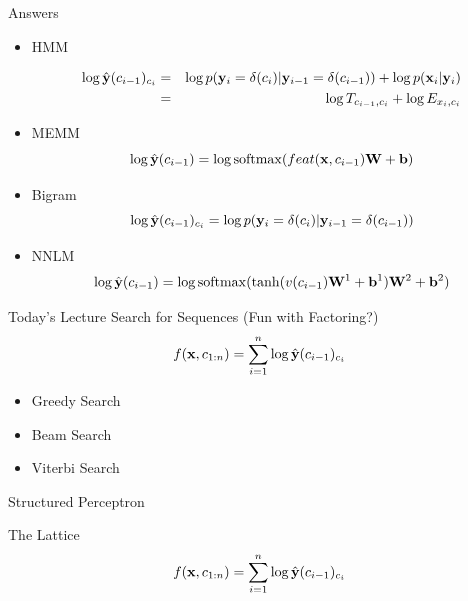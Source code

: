 \documentclass{beamer}
\def\Lattice{
    \matrix (network)
    [matrix of nodes,
    nodes in empty cells,
    ampersand replacement=\&,
    column sep={1cm},
    row sep={0.1cm},
    nodes={outer sep=0pt,circle,minimum size=0.5cm, minimum width=1.3cm,draw, rectangle} ]
    {
     O \& O \& O \& O \& O\\
     I-PER \& I-PER \& I-PER \& I-PER \& I-PER \\ 
     I-ORG \& I-ORG \& I-ORG \& I-ORG \& I-ORG \\ 
     I-LOC \& I-LOC \& I-LOC \& I-LOC \& I-LOC \\ 
     |[draw=none]| \\
     |[draw=none]| Mayor \& |[draw=none]| DeBlasio \& |[draw=none]| from \& |[draw=none]| New  \& |[draw=none]| York  \\  
};
}
\begin{document}
\begin{frame}[allowframebreaks]{Answers}
  \begin{itemize}
  \item HMM

    \begin{eqnarray*}
      \log \hat{\mathbf{y}}(c_{i-1})_{c_i} &=& \log p(\mathbf{y}_i = \delta(c_{i}) | \mathbf{y}_{i-1}=\delta(c_{i-1})) + \log p(\mathbf{x}_i| \mathbf{y}_i )  \\
                                       &=& \log T_{c_{i-1}, c_i}  + \log E_{x_i, c_i}
    \end{eqnarray*}



  \item MEMM
    \[\log \hat{\boldy}(c_{i-1}) = \log \softmax(feat(\boldx, c_{i-1}) \boldW + \boldb)  \]


    

  \item Bigram 
    \[\log \hat{\mathbf{y}}(c_{i-1})_{c_i} = \log p(\mathbf{y}_i = \delta(c_{i}) | \mathbf{y}_{i-1}=\delta(c_{i-1}))  \]

  \item NNLM 
    \[\log \hat{\boldy}(c_{i-1}) = \log \softmax(\tanh(v(c_{i-1}) \boldW^1 + \boldb^1) \boldW^2 + \boldb^2)  \]

  \end{itemize}
\end{frame}

\begin{frame}{Today's Lecture}
  Search for Sequences (Fun with Factoring?)
  \[ f(\mathbf{x}, c_{1:n})  = \sum_{i=1}^n \log \hat{\mathbf{y}}(c_{i-1})_{c_i} \] 
  
  \begin{itemize}
  \item Greedy Search
    \air 
  \item Beam Search
    \air 
  \item Viterbi Search   
  \end{itemize}

  Structured Perceptron
\end{frame}

\begin{frame}{The Lattice}
    \[ f(\mathbf{x}, c_{1:n})  = \sum_{i=1}^n \log \hat{\mathbf{y}}(c_{i-1})_{c_i} \] 

\end{frame}
\end{document}
